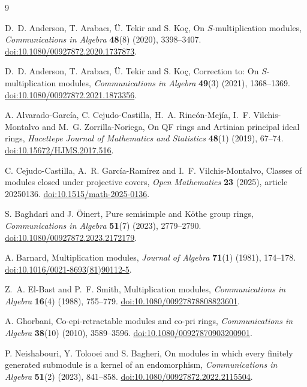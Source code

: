 \documentclass[11pt,a4paper]{article}
\theoremstyle{definition}
\theoremstyle{remark}
\begin{document}
\begin{thebibliography}{9}

D.~D. Anderson, T. Arabac\i, \"U. Tekir and S. Ko\c{c},
On $S$-multiplication modules,
\emph{Communications in Algebra} \textbf{48}(8)
(2020), 3398--3407.
\href{https://doi.org/10.1080/00927872.2020.1737873}
{doi:10.1080/00927872.2020.1737873}.

D.~D. Anderson, T. Arabac\i, \"U. Tekir and S. Ko\c{c},
Correction to: On $S$-multiplication modules,
\emph{Communications in Algebra} \textbf{49}(3)
(2021), 1368--1369.
\href{https://doi.org/10.1080/00927872.2021.1873356}
{doi:10.1080/00927872.2021.1873356}.

A. Alvarado-Garc\'ia, C. Cejudo-Castilla,
H.~A. Rinc\'on-Mej\'ia, I.~F. Vilchis-Montalvo
and M.~G. Zorrilla-Noriega,
On QF rings and Artinian principal ideal rings,
\emph{Hacettepe Journal of Mathematics and Statistics}
\textbf{48}(1) (2019), 67--74.
\href{https://doi.org/10.15672/HJMS.2017.516}
{doi:10.15672/HJMS.2017.516}.

C. Cejudo-Castilla, A.~R. Garc\'ia-Ram\'irez
and I.~F. Vilchis-Montalvo,
Classes of modules closed under projective covers,
\emph{Open Mathematics} \textbf{23} (2025),
article 20250136.
\href{https://doi.org/10.1515/math-2025-0136}
{doi:10.1515/math-2025-0136}.

S. Baghdari and J. \"Oinert,
Pure semisimple and K\"othe group rings,
\emph{Communications in Algebra} \textbf{51}(7)
(2023), 2779--2790.
\href{https://doi.org/10.1080/00927872.2023.2172179}
{doi:10.1080/00927872.2023.2172179}.

A. Barnard,
Multiplication modules,
\emph{Journal of Algebra} \textbf{71}(1)
(1981), 174--178.
\href{https://doi.org/10.1016/0021-8693(81)90112-5}
{doi:10.1016/0021-8693(81)90112-5}.

Z.~A. El-Bast and P.~F. Smith,
Multiplication modules,
\emph{Communications in Algebra} \textbf{16}(4)
(1988), 755--779.
\href{https://doi.org/10.1080/00927878808823601}
{doi:10.1080/00927878808823601}.

A. Ghorbani,
Co-epi-retractable modules and co-pri rings,
\emph{Communications in Algebra} \textbf{38}(10)
(2010), 3589--3596.
\href{https://doi.org/10.1080/00927870903200901}
{doi:10.1080/00927870903200901}.

P. Neishabouri, Y. Tolooei and S. Bagheri,
On modules in which every finitely generated
submodule is a kernel of an endomorphism,
\emph{Communications in Algebra} \textbf{51}(2)
(2023), 841--858.
\href{https://doi.org/10.1080/00927872.2022.2115504}
{doi:10.1080/00927872.2022.2115504}.

\end{thebibliography}
\end{document}
